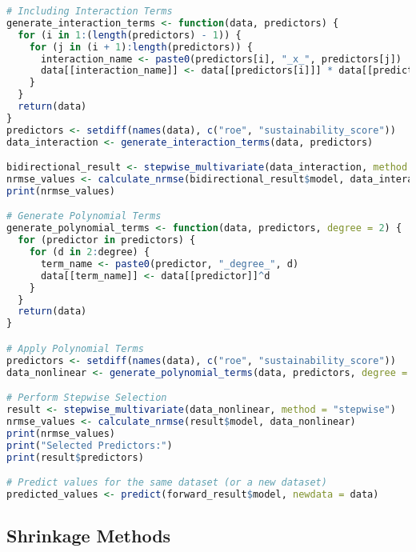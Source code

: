 \begin{lstlisting}[language=R, breaklines=true, basicstyle=\ttfamily\small, columns=fullflexible]
# Including Interaction Terms
generate_interaction_terms <- function(data, predictors) {
  for (i in 1:(length(predictors) - 1)) {
    for (j in (i + 1):length(predictors)) {
      interaction_name <- paste0(predictors[i], "_x_", predictors[j])
      data[[interaction_name]] <- data[[predictors[i]]] * data[[predictors[j]]]
    }
  }
  return(data)
}
predictors <- setdiff(names(data), c("roe", "sustainability_score"))
data_interaction <- generate_interaction_terms(data, predictors)

bidirectional_result <- stepwise_multivariate(data_interaction, method = "stepwise")
nrmse_values <- calculate_nrmse(bidirectional_result$model, data_interaction)
print(nrmse_values)

# Generate Polynomial Terms
generate_polynomial_terms <- function(data, predictors, degree = 2) {
  for (predictor in predictors) {
    for (d in 2:degree) {
      term_name <- paste0(predictor, "_degree_", d)
      data[[term_name]] <- data[[predictor]]^d
    }
  }
  return(data)
}

# Apply Polynomial Terms
predictors <- setdiff(names(data), c("roe", "sustainability_score"))
data_nonlinear <- generate_polynomial_terms(data, predictors, degree = 3)

# Perform Stepwise Selection
result <- stepwise_multivariate(data_nonlinear, method = "stepwise")
nrmse_values <- calculate_nrmse(result$model, data_nonlinear)
print(nrmse_values)
print("Selected Predictors:")
print(result$predictors)

# Predict values for the same dataset (or a new dataset)
predicted_values <- predict(forward_result$model, newdata = data)

\end{lstlisting}

\subsection{Shrinkage Methods}

